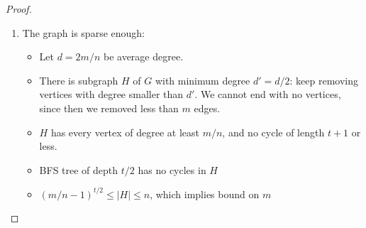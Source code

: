 \documentclass[11pt]{article}
\begin{document}
\begin{proof}
\begin{enumerate}
\begin{proof}
\begin{itemize}
		\item As we now have a counterexample where $|P_G|=1$ and $|P_H|>t|P_G|=t$, we arrive at a contradiction: when we were processing the only edge on $P_G$, we should have added it to $H$ as it didn't cause a cycle of length $\leq t+1$ - it doesn't cause that now as $d_H(u,v) = |P_H| \geq t+1$ and in the time of processing of that edge it also didn't as $H$ at that time was a subgraph of the final $H$.
	\end{itemize}
\end{proof}
\item The graph is sparse enough:
\begin{itemize}
\item Let $d = 2m/n$ be average degree.
\item There is subgraph $H$ of $G$ with minimum degree $d' = d/2$: keep removing vertices with degree smaller than $d'$. We cannot end with no vertices, since then we removed less than $m$ edges.
\item $H$ has every vertex of degree at least $m/n$, and no cycle of length $t+1$ or less.
\item BFS tree of depth $t/2$ has no cycles in $H$
\item $(m/n-1)^{t/2} \le |H| \le n$, which implies bound on $m$
\end{itemize}
\end{enumerate}
\end{proof}
\end{document}
